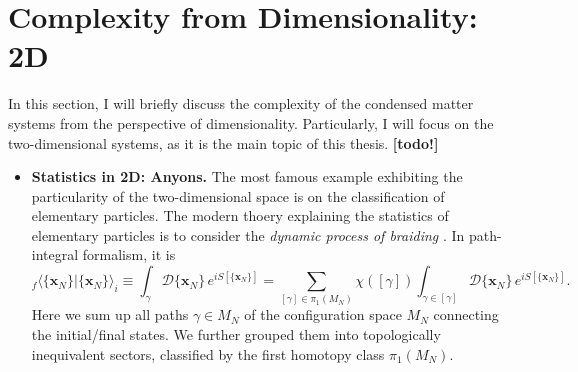 \section{Complexity from Dimensionality: 2D}
In this section, I will briefly discuss the complexity of the condensed matter systems from the perspective of dimensionality. Particularly, I will focus on the two-dimensional systems, as it is the main topic of this thesis. \textbf{[todo!]}
\begin{itemize}
    \item \textbf{Statistics in 2D: Anyons.} The most famous example exhibiting the particularity of the two-dimensional space is on the classification of elementary particles. The modern thoery explaining the statistics of elementary particles is to consider the \emph{dynamic process of braiding} \cite{laidlaw1971feynman,wu1984general}. In path-integral formalism, it is
          \begin{equation*}
              _f\langle \{\bm x_N\}|\{\bm x_N\}\rangle_i\equiv\int_{\gamma}\mathcal D\{\bm x_N\}\, e^{iS[\{\bm x_N\}]}=\sum_{[\gamma]\in\pi_1(M_N)}\chi([\gamma])\int_{\gamma\in[\gamma]}\mathcal D\{\bm x_N\}\, e^{iS[\{\bm x_N\}]}.
          \end{equation*}
          Here we sum up all paths $\gamma\in M_N$ of the conﬁguration space $M_N$ connecting the initial/ﬁnal states. We further grouped them into topologically inequivalent sectors, classiﬁed by the ﬁrst homotopy class $\pi_1(M_N)$.


\end{itemize}
